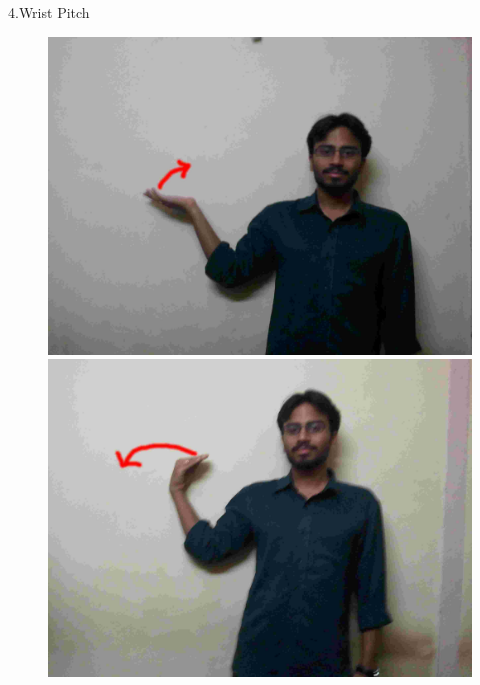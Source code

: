 \documentclass{beamer}
\begin{document}
\begin{frame}{4.Wrist Pitch}
  \begin{figure}
      \centering
      \includegraphics[scale = .06]{gestures/41.jpg} 
      \includegraphics[scale = .06]{gestures/42.jpg} 
  \end{figure}
\end{frame}
\end{document}
